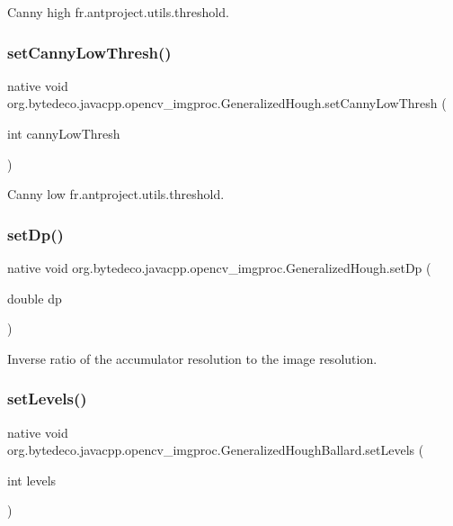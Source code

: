 Canny high fr.antproject.utils.threshold. \mbox{\label{group__imgproc_ga730f9badfb99e9689367d51afa76ef94}}
\subsubsection{\texorpdfstring{set\+Canny\+Low\+Thresh()}{setCannyLowThresh()}}
{\footnotesize\ttfamily native void org.\+bytedeco.\+javacpp.\+opencv\+\_\+imgproc.\+Generalized\+Hough.\+set\+Canny\+Low\+Thresh (\begin{DoxyParamCaption}\item[{int}]{canny\+Low\+Thresh }\end{DoxyParamCaption})}

Canny low fr.antproject.utils.threshold. \mbox{\label{group__imgproc_ga08c264185f923eab1e7b28a97c8a99ae}}
\subsubsection{\texorpdfstring{set\+Dp()}{setDp()}}
{\footnotesize\ttfamily native void org.\+bytedeco.\+javacpp.\+opencv\+\_\+imgproc.\+Generalized\+Hough.\+set\+Dp (\begin{DoxyParamCaption}\item[{double}]{dp }\end{DoxyParamCaption})}

Inverse ratio of the accumulator resolution to the image resolution. \mbox{\label{group__imgproc_ga08916f9b4499b2356dd542266564dec0}} 
\subsubsection{\texorpdfstring{set\+Levels()}{setLevels()}\hspace{0.1cm}{\footnotesize\ttfamily [1/2]}}
{\footnotesize\ttfamily native void org.\+bytedeco.\+javacpp.\+opencv\+\_\+imgproc.\+Generalized\+Hough\+Ballard.\+set\+Levels (\begin{DoxyParamCaption}\item[{int}]{levels }\end{DoxyParamCaption})}

